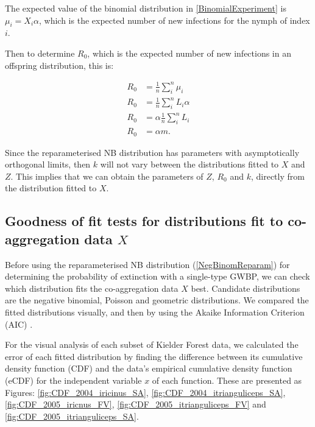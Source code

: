 \documentclass[hidelinks]{article}
\begin{document}
The expected value of the binomial distribution in \eqref{BinomialExperiment} is $ \mu_i = X_i \alpha $, which is the expected number of new infections for the nymph of index $ i $.

Then to determine $ R_0 $, which is the expected number of new infections in an offspring distribution, this is:

\begin{align}
    R_0 &= \frac{1}{n} \sum_i^n \mu_i \nonumber \\
    R_0 &= \frac{1}{n} \sum_i^n L_i \alpha \nonumber \\
    R_0 &= \alpha \frac{1}{n} \sum_i^n L_i \nonumber \\
    R_0 &= \alpha m \label{FindingR0FromCoaggregationMean}.
\end{align}

Since the reparameterised NB distribution has parameters with asymptotically orthogonal limits, then $ k $ will not vary between the distributions fitted to $ X $ and $ Z $. This implies that we can obtain the parameters of $ Z $, $ R_0 $ and $ k $, directly from the distribution fitted to $ X $.

\subsection{Goodness of fit tests for distributions fit to co-aggregation data \texorpdfstring{$ X $}{X}} 

Before using the reparameterised NB distribution (\ref{NegBinomReparam}) for determining the probability of extinction with a single-type GWBP, we can check which distribution fits the co-aggregation data $ X $ best. Candidate distributions are the negative binomial, Poisson and geometric distributions. We compared the fitted distributions visually, and then by using the Akaike Information Criterion (AIC) \citep{LloydSmith2005}.

For the visual analysis of each subset of Kielder Forest data, we calculated the error of each fitted distribution by finding the difference between its cumulative density function (CDF) and the data's empirical cumulative density function (eCDF) for the independent variable $ x $ of each function. These are presented as Figures: \ref{fig:CDF_2004_iricinus_SA}, \ref{fig:CDF_2004_itrianguliceps_SA}, \ref{fig:CDF_2005_iricnus_FV}, \ref{fig:CDF_2005_itrianguliceps_FV} and \ref{fig:CDF_2005_itrianguliceps_SA}.
\end{document}

